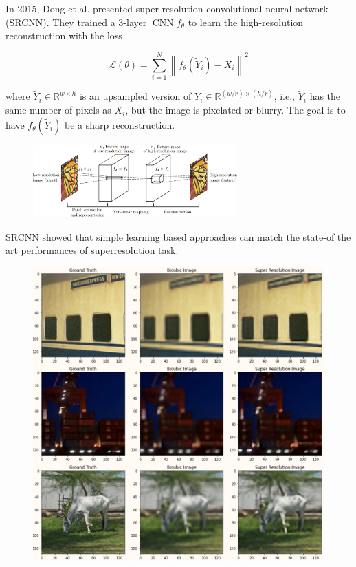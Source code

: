 \documentclass{report}
\begin{document}
\begin{definition}[8.6][SRCNN]
    In 2015, Dong et al. presented super-resolution convolutional neural network (SRCNN). They trained a 3-layer $\operatorname{CNN} f_{\theta}$ to learn the high-resolution reconstruction with the loss

    $$
    \mathcal{L}(\theta)=\sum_{i=1}^{N}\left\|f_{\theta}\left(\tilde{Y}_{i}\right)-X_{i}\right\|^{2}
    $$

    where $\tilde{Y}_{i} \in \mathbb{R}^{w \times h}$ is an upsampled version of $Y_{i} \in \mathbb{R}^{(w / r) \times(h / r)}$, i.e., $\tilde{Y}_{i}$ has the same number of pixels as $X_{i}$, but the image is pixelated or blurry. The goal is to have $f_{\theta}\left(\tilde{Y}_{i}\right)$ be a sharp reconstruction.

    \begin{figure}[H]
        \centering
        \includegraphics[width=0.7\textwidth]{.././assets/8.3.png}
    \end{figure}

    \par\noindent\textcolor{gray}{\hdashrule{\textwidth}{0.4pt}{1pt 2pt}}

    SRCNN showed that simple learning based approaches can match the state-of the art performances of superresolution task.

    \begin{figure}[H]
        \centering
        \includegraphics[width=1.0\textwidth]{.././assets/8.4.png}
    \end{figure}


\end{definition}
\end{document}

